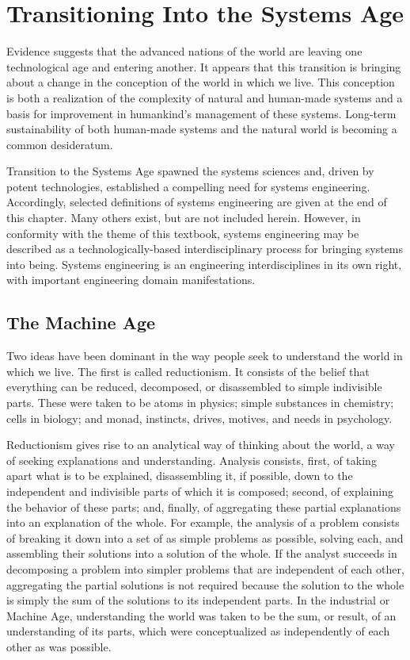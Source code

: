 \section{Transitioning Into the Systems Age}

Evidence suggests that the advanced nations of the world are leaving one technological age and entering another. It appears that this transition is bringing about a change in the conception of the world in which we live. This conception is both a realization of the complexity of natural and human-made systems and a basis for improvement in humankind’s management of these systems. Long-term sustainability of both human-made systems and the natural world is becoming a common desideratum.

Transition to the Systems Age spawned the systems sciences and, driven by potent technologies, established a compelling need for systems engineering. Accordingly, selected definitions of systems engineering are given at the end of this chapter. Many others exist, but are not included herein. However, in conformity with the theme of this textbook, systems engineering may be described as a technologically-based interdisciplinary process for bringing systems into being. Systems engineering is an engineering interdisciplines in its own right, with important engineering domain manifestations.

\subsection{The Machine Age}

Two ideas have been dominant in the way people seek to understand the world in which we live. The first is called reductionism. It consists of the belief that everything can be reduced, decomposed, or disassembled to simple indivisible parts. These were taken to be atoms in physics; simple substances in chemistry; cells in biology; and monad, instincts, drives, motives, and needs in psychology.

Reductionism gives rise to an analytical way of thinking about the world, a way of seeking explanations and understanding. Analysis consists, first, of taking apart what is to be explained, disassembling it, if possible, down to the independent and indivisible parts of which it is composed; second, of explaining the behavior of these parts; and, finally, of aggregating these partial explanations into an explanation of the whole. For example, the analysis of a problem consists of breaking it down into a set of as simple problems as possible, solving each, and assembling their solutions into a solution of the whole. If the analyst succeeds in decomposing a problem into simpler problems that are independent of each other, aggregating the partial solutions is not required because the solution to the whole is simply the sum of the solutions to its independent parts. In the industrial or Machine Age, understanding the world was taken to be the sum, or result, of an understanding of its parts, which were conceptualized as independently of each other as was possible.

